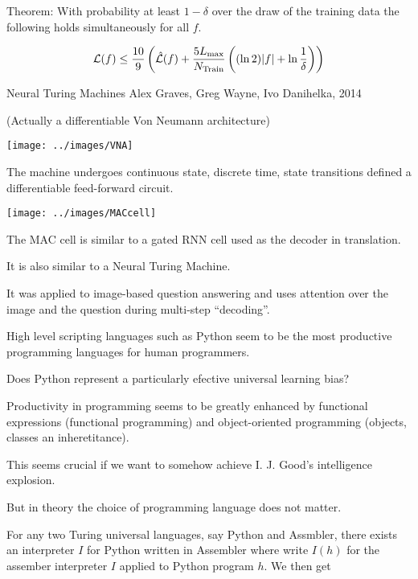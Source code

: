 {\vfill
Theorem: With probability at least $1-\delta$ over the draw of the training data the following holds simultaneously for all $f$.

{\color{red} $${\cal L}(f) \leq \frac{10}{9}\left(\hat{{\cal L}}(f) + \frac{5L_{\max}}{N_\mathrm{Train}}\left((\ln 2)|f| +\ln\frac{1}{\delta}\right)\right)$$}


Neural Turing Machines
Alex Graves, Greg Wayne, Ivo Danihelka, 2014

\vfill
(Actually a differentiable Von Neumann architecture)

\vfill
\centerline{\texttt{[image: ../images/VNA]}}

\vfill
The machine undergoes continuous state, discrete time, state transitions defined a differentiable feed-forward circuit.


\centerline{\texttt{[image: ../images/MACcell]}}

The MAC cell is similar to a gated RNN cell used as the decoder in translation.

\vfill
It is also similar to a Neural Turing Machine.

\vfill
It was applied to image-based question answering and uses attention over the image and the question during multi-step ``decoding''.


High level scripting languages such as Python seem to be the most productive programming languages for human programmers.

\vfill
Does Python represent a particularly efective universal learning bias?

\vfill
Productivity in programming seems to be greatly enhanced by functional expressions (functional programming) and object-oriented programming
(objects, classes an inheretitance).

\vfill
This seems crucial if we want to somehow achieve I. J. Good's intelligence explosion.


But in theory the choice of programming language does not matter.

\vfill
For any two Turing universal languages, say Python and Assmbler, there exists an interpreter $I$ for Python written in Assembler
where write $I(h)$ for the assember interpreter $I$ applied to Python program $h$.  We then get

}
